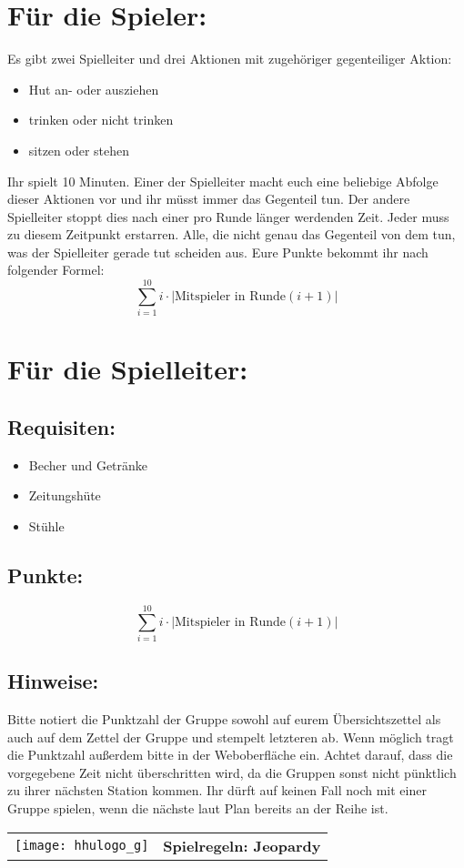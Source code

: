 \documentclass[a4paper,10pt]{article}
\def\spielf{Jeopardy}
\newcommand{\unten}{
 Bitte notiert die Punktzahl der Gruppe sowohl auf eurem Übersichtszettel als auch auf dem Zettel der Gruppe und stempelt letzteren ab. Wenn möglich tragt die Punktzahl außerdem bitte in der Weboberfläche ein.
 Achtet darauf, dass die vorgegebene Zeit nicht überschritten wird, da die Gruppen sonst nicht pünktlich zu ihrer nächsten Station kommen. Ihr dürft auf keinen Fall noch mit einer Gruppe spielen, wenn die nächste laut Plan bereits an der Reihe ist.
}
\begin{document}
\Large
\section*{Für die Spieler:}
Es gibt zwei Spielleiter und drei Aktionen mit zugehöriger gegenteiliger Aktion: 
\begin{itemize}
 \item Hut an- oder ausziehen
 \item trinken oder nicht trinken
 \item sitzen oder stehen
\end{itemize}
Ihr spielt 10 Minuten. Einer der Spielleiter macht euch eine beliebige Abfolge dieser Aktionen vor und ihr müsst immer das Gegenteil tun. Der andere Spielleiter stoppt dies nach einer pro Runde länger werdenden Zeit. Jeder muss zu diesem Zeitpunkt erstarren. Alle, die nicht genau das Gegenteil von dem tun, was der Spielleiter gerade tut scheiden aus. Eure Punkte bekommt ihr nach folgender Formel:\\
$$\sum\limits_{i=1}^{10}i \cdot |\mbox{Mitspieler in Runde}  (i+1)|$$


\section*{Für die Spielleiter:}
\subsection*{Requisiten:}
\begin{itemize}
 \item Becher und Getränke
 \item Zeitungshüte
 \item Stühle 
\end{itemize}
\subsection*{Punkte:}
$$\sum\limits_{i=1}^{10}i \cdot |\mbox{Mitspieler in Runde} (i+1)|$$

\subsection*{Hinweise:}
\unten

\newpage

  \begin{tabularx}{\textwidth}{lc}
    \texttt{[image: hhulogo\_g]}
  & {\Huge \textbf{Spielregeln: \spielf}}
  \end{tabularx}\\
\end{document}
